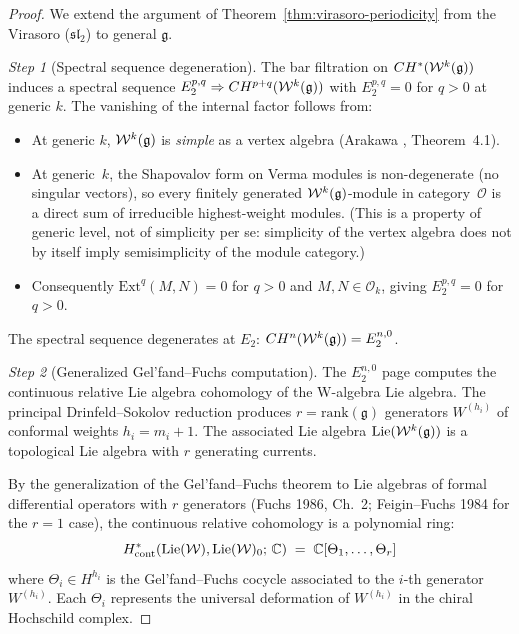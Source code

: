 \begin{proof}
We extend the argument of Theorem~\ref{thm:virasoro-periodicity} from the
Virasoro ($\mathfrak{sl}_2$) to general $\mathfrak{g}$.

\emph{Step 1} (Spectral sequence degeneration).
The bar filtration on $CH^*(\mathcal{W}^k(\mathfrak{g}))$ induces a spectral
sequence
$E_2^{p,q} \Rightarrow CH^{p+q}(\mathcal{W}^k(\mathfrak{g}))$
with $E_2^{p,q} = 0$ for $q > 0$ at generic $k$.  The vanishing of the
internal factor follows from:
\begin{itemize}
\item At generic $k$, $\mathcal{W}^k(\mathfrak{g})$ is \emph{simple}
      as a vertex algebra (Arakawa \cite{Ara07}, Theorem~4.1).
\item At generic~$k$, the Shapovalov form on Verma modules is
      non-degenerate (no singular vectors), so every
      finitely generated $\mathcal{W}^k(\mathfrak{g})$-module in category~$\mathcal{O}$
      is a direct sum of irreducible highest-weight modules.
      (This is a property of generic level, not of simplicity per se:
      simplicity of the vertex algebra does not by itself imply
      semisimplicity of the module category.)
\item Consequently $\mathrm{Ext}^q(M, N) = 0$ for $q > 0$ and
      $M, N \in \mathcal{O}_k$, giving $E_2^{p,q} = 0$ for $q > 0$.
\end{itemize}
The spectral sequence degenerates at $E_2$:
$CH^n(\mathcal{W}^k(\mathfrak{g})) = E_2^{n,0}$.

\emph{Step 2} (Generalized Gel'fand--Fuchs computation).
The $E_2^{n,0}$ page computes the continuous relative Lie algebra cohomology
of the W-algebra Lie algebra.  The principal Drinfeld--Sokolov reduction
produces $r = \mathrm{rank}(\mathfrak{g})$ generators
$W^{(h_i)}$ of conformal weights $h_i = m_i + 1$.  The associated Lie
algebra $\mathrm{Lie}(\mathcal{W}^k(\mathfrak{g}))$ is a topological Lie algebra
with $r$ generating currents.

By the generalization of the Gel'fand--Fuchs theorem to Lie algebras of
formal differential operators with $r$ generators (Fuchs 1986, Ch.~2;
Feigin--Fuchs 1984 for the $r = 1$ case), the continuous relative
cohomology is a polynomial ring:
\[H^*_{\mathrm{cont}}(\mathrm{Lie}(\mathcal{W}), \mathrm{Lie}(\mathcal{W})_0;\,
\mathbb{C}) \;=\; \mathbb{C}[\Theta_1, \ldots, \Theta_r]\]
where $\Theta_i \in H^{h_i}$ is the Gel'fand--Fuchs cocycle associated
to the $i$-th generator $W^{(h_i)}$.  Each $\Theta_i$ represents the
universal deformation of $W^{(h_i)}$ in the chiral Hochschild complex.


\end{proof}
